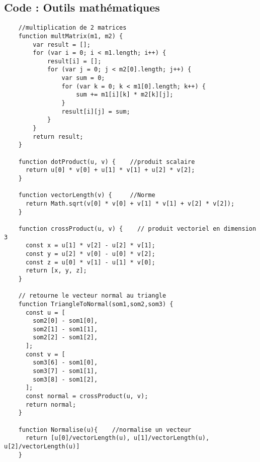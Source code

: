 \subsection{Code : Outils mathématiques}

\begin{verbatim}
    //multiplication de 2 matrices
    function multMatrix(m1, m2) {
        var result = [];
        for (var i = 0; i < m1.length; i++) {
            result[i] = [];
            for (var j = 0; j < m2[0].length; j++) {
                var sum = 0;
                for (var k = 0; k < m1[0].length; k++) {
                    sum += m1[i][k] * m2[k][j];
                }
                result[i][j] = sum;
            }
        }
        return result;
    }
    
    function dotProduct(u, v) {    //produit scalaire 
      return u[0] * v[0] + u[1] * v[1] + u[2] * v[2];
    }
    
    function vectorLength(v) {     //Norme
      return Math.sqrt(v[0] * v[0] + v[1] * v[1] + v[2] * v[2]);
    }
    
    function crossProduct(u, v) {    // produit vectoriel en dimension 3
      const x = u[1] * v[2] - u[2] * v[1];
      const y = u[2] * v[0] - u[0] * v[2];
      const z = u[0] * v[1] - u[1] * v[0];
      return [x, y, z];
    }
    
    // retourne le vecteur normal au triangle
    function TriangleToNormal(som1,som2,som3) {
      const u = [
        som2[0] - som1[0],
        som2[1] - som1[1],
        som2[2] - som1[2],
      ];
      const v = [
        som3[6] - som1[0],
        som3[7] - som1[1],
        som3[8] - som1[2],
      ];
      const normal = crossProduct(u, v);
      return normal;
    }
    
    function Normalise(u){    //normalise un vecteur
      return [u[0]/vectorLength(u), u[1]/vectorLength(u), u[2]/vectorLength(u)]
    }
\end{verbatim}

\clearpage

